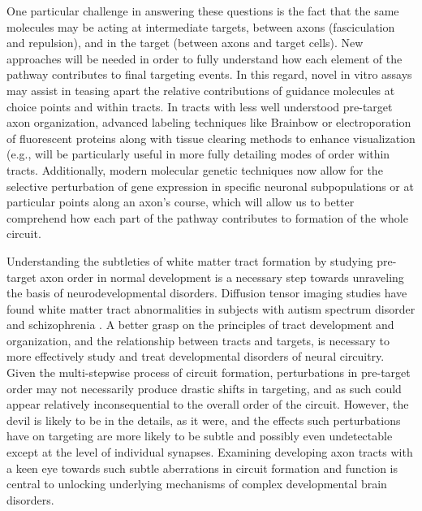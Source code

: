 One particular challenge in answering these questions is the fact that the same molecules may be acting at intermediate targets, between axons (fasciculation and repulsion), and in the target (between axons and target cells).
New approaches will be needed in order to fully understand how each element of the pathway contributes to final targeting events.
In this regard, novel in vitro assays may assist in teasing apart the relative contributions of guidance molecules at choice points and within tracts.
In tracts with less well understood pre-target axon organization, advanced labeling techniques like Brainbow \cite{lu2009interscutularis} or electroporation of fluorescent proteins \cite{saito2001efficient} along with tissue clearing methods to enhance visualization (e.g., \cite{erturk2012three,kuwajima2013cleart,tomer2014advanced} will be particularly useful in more fully detailing modes of order within tracts. %
Additionally, modern molecular genetic techniques now allow for the selective perturbation of gene expression in specific neuronal subpopulations or at particular points along an axon’s course, which will allow us to better comprehend how each part of the pathway contributes to formation of the whole circuit.

Understanding the subtleties of white matter tract formation by studying pre-target axon order in normal development is a necessary step towards unraveling the basis of neurodevelopmental disorders.
Diffusion tensor imaging studies have found white matter tract abnormalities in subjects with autism spectrum disorder \cite{wolff2012differences} and schizophrenia \cite{kubicki2007review}.
A better grasp on the principles of tract development and organization, and the relationship between tracts and targets, is necessary to more effectively study and treat developmental disorders of neural circuitry.
Given the multi-stepwise process of circuit formation, perturbations in pre-target order may not necessarily produce drastic shifts in targeting, and as such could appear relatively inconsequential to the overall order of the circuit.
However, the devil is likely to be in the details, as it were, and the effects such perturbations have on targeting are more likely to be subtle and possibly even undetectable except at the level of individual synapses.
Examining developing axon tracts with a keen eye towards such subtle aberrations in circuit formation and function is central to unlocking underlying mechanisms of complex developmental brain disorders.
